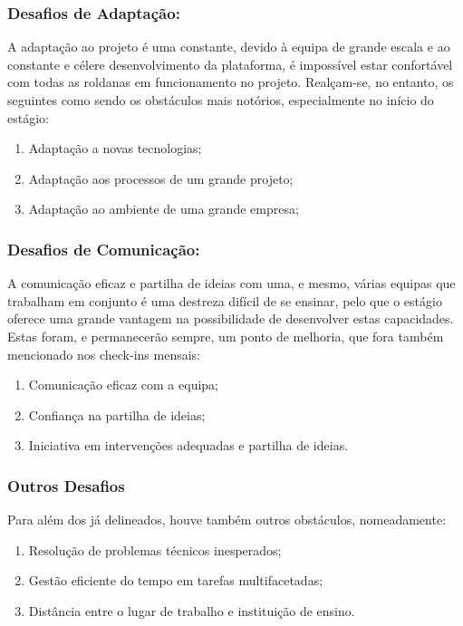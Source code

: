         \subsubsection*{Desafios de Adaptação:}
        A adaptação ao projeto é uma constante, devido à equipa de grande escala e ao constante e célere desenvolvimento da plataforma, é impossível estar confortável com todas as roldanas em funcionamento no projeto. Realçam-se, no entanto, os seguintes como sendo os obstáculos mais notórios, especialmente no início do estágio:
        \begin{enumerate}
            \item Adaptação a novas tecnologias;
            \item Adaptação aos processos de um grande projeto;
            \item Adaptação ao ambiente de uma grande empresa;
        \end{enumerate}
        
        \subsubsection*{Desafios de Comunicação:}
        A comunicação eficaz e partilha de ideias com uma, e mesmo, várias equipas que trabalham em conjunto é uma destreza difícil de se ensinar, pelo que o estágio oferece uma grande vantagem na possibilidade de desenvolver estas capacidades. Estas foram, e permanecerão sempre, um ponto de melhoria, que fora também mencionado nos check-ins mensais:
        \begin{enumerate}
            \item Comunicação eficaz com a equipa;
            \item Confiança na partilha de ideias;
            \item Iniciativa em intervenções adequadas e partilha de ideias.
        \end{enumerate}

        \subsubsection*{Outros Desafios}
        Para além dos já delineados, houve também outros obstáculos, nomeadamente:
        \begin{enumerate}
            \item Resolução de problemas técnicos inesperados;
            \item Gestão eficiente do tempo em tarefas multifacetadas;
            \item Distância entre o lugar de trabalho e instituição de ensino.
        \end{enumerate}

